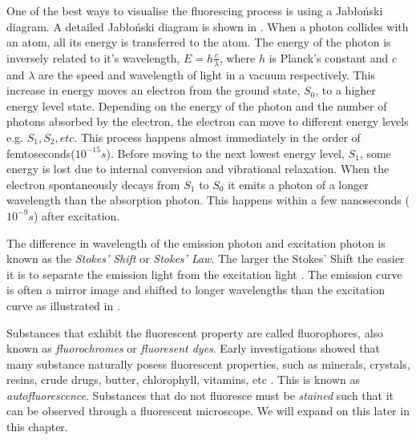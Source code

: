 \begin{definition}
	One of the best ways to visualise the fluorescing process is using a Jab{\l}o{\'n}ski diagram.
	A detailed Jab{\l}o{\'n}ski diagram is shown in . 
	When a photon collides with an atom, all its energy is transferred to the atom. The energy of the photon is inversely related to it's wavelength, $E = h \frac{c}{\lambda}$, where $h$ is Planck's constant and $c$ and $\lambda$ are the speed and wavelength of light in a vacuum respectively.
	This increase in energy moves an electron from the ground state, $S_0$, to a higher energy level state.
	Depending on the energy of the photon and the number of photons absorbed by the electron, the electron can move to different energy levels e.g. $S_1, S_2, etc$.
	This process happens almost immediately in the order of femtoseconds($10^{-15}s$).
	Before moving to the next lowest energy level, $S_1$, some energy is lost due to internal conversion and vibrational relaxation.
	When the electron spontaneously decays from $S_1$ to $S_0$ it emits a photon of a longer wavelength than the absorption photon.
	This happens within a few nanoseconds ($10^{-9}s$) after excitation.
	
	The difference in wavelength of the emission photon and excitation photon is known as the \textit{Stokes' Shift} or \textit{Stokes' Law}.
	The larger the Stokes' Shift the easier it is to separate the emission light from the excitation light \citep{Spring2003}.
	The emission curve is often a mirror image and shifted to longer wavelengths than the excitation curve as illustrated in .
\end{definition}

\begin{definition}[Fluorophores]
	Substances that exhibit the fluorescent property are called fluorophores, also known as \textit{fluorochromes} or \textit{fluoresent dyes}.
	Early investigations showed that many substance naturally posess fluorescent properties, such as minerals, crystals, resins, crude drugs, butter, chlorophyll, vitamins, etc \citep{Spring2003}.
	This is known as \textit{autofluorescence}.
	Substances that do not fluoresce must be \textit{stained} such that it can be observed through a fluorescent microscope.
	We will expand on this later in this chapter.
\end{definition}


